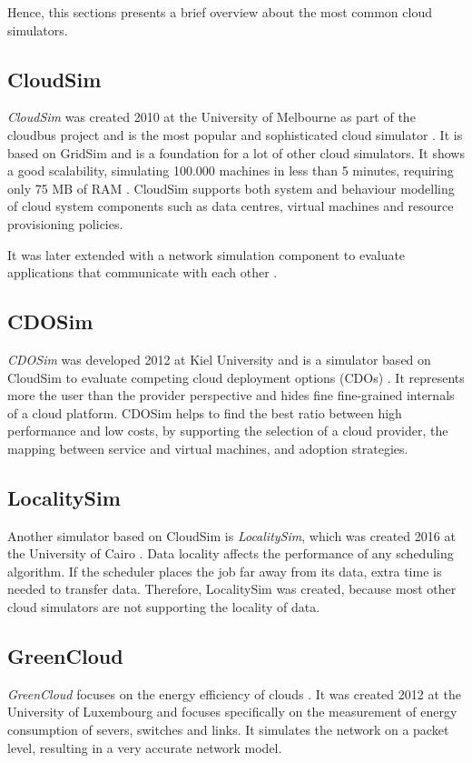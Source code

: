 Hence, this sections presents a brief overview about the most common cloud simulators.

\subsection{CloudSim}
\textit{CloudSim} was created 2010 at the University of Melbourne as part of the cloudbus project and is the most popular and sophisticated cloud simulator \cite{compare_grid_cloud}. It is based on GridSim and is a foundation for a lot of other cloud simulators.
It shows a good scalability, simulating 100.000 machines in less than 5 minutes, requiring only 75 MB of RAM \cite{survey_clouds}. CloudSim supports both system and behaviour modelling of cloud system components such as data centres, virtual machines and resource provisioning policies.

It was later extended with a network simulation component to evaluate applications that communicate with each other \cite{networkcloudsim}.

\subsection{CDOSim}
\textit{CDOSim} was developed 2012 at Kiel University and is a simulator based on CloudSim to evaluate competing cloud deployment options (CDOs) \cite{cdosim}. It represents more the user than the provider perspective and hides fine fine-grained internals of a cloud platform. CDOSim helps to find the best ratio between high performance and low costs, by supporting the selection of a cloud provider, the mapping between service and virtual machines, and adoption strategies. 

\subsection{LocalitySim}
Another simulator based on CloudSim is \textit{LocalitySim}, which was created 2016 at the University of Cairo \cite{localitysim}. Data locality affects the performance of any scheduling algorithm. If the scheduler places the job far away from its data, extra time is needed to transfer data. Therefore, LocalitySim was created, because most other cloud simulators are not supporting the locality of data.

\subsection{GreenCloud}
\textit{GreenCloud} focuses on the energy efficiency of clouds \cite{green_cloud}. It was created 2012 
at the University of Luxembourg and focuses specifically on the measurement of energy consumption of severs, switches and links. It simulates the network on a packet level, resulting in a very accurate network model.  

